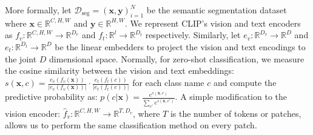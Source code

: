 \documentclass[10pt,twocolumn,letterpaper]{article}
\begin{document}
More formally, let $\mathcal{D}_{\mathrm{seg}} = (\mathbf{x}, \mathbf{y})_{i=1}^N$ be the semantic segmentation dataset where $\mathbf{x} \in \mathbb{R}^{C, H, W}$ and $\mathbf{y} \in \mathbb{R}^{H, W}$. We represent CLIP's vision and text encoders as $f_v: \mathbb{R}^{C, H, W} \rightarrow \mathbb{R}^{D_v}$ and $f_t: \mathbb{R}^{l} \rightarrow \mathbb{R}^{D_t}$ respectively. Similarly, let $e_v: \mathbb{R}^{D_v} \rightarrow \mathbb{R}^{D}$ and $e_t: \mathbb{R}^{D_t} \rightarrow \mathbb{R}^{D}$ be the linear embedders to project the vision and text encodings to the joint $D$ dimensional space. Normally, for zero-shot classification, we measure the cosine similarity between the vision and text embeddings: $s(\mathbf{x}, c) = \frac{e_v(f_v(\mathbf{x}))}{|e_v(f_v(\mathbf{x}))|} \cdot \frac{e_t(f_t(c))}{|e_t(f_t(c))|}$ for each class name $c$ and compute the predictive probability as: $p(c|\mathbf{x}) = \frac{e^{s(\mathbf{x}, c)}}{\sum_{c'}e^{s(\mathbf{x}, c')}}$. A simple modification to the vision encoder: $\hat{f}_v: \mathbb{R}^{C, H, W} \rightarrow \mathbb{R}^{T, D_v}$, where $T$ is the number of tokens or patches, allows us to perform the same classification method on every patch.
\end{document}
